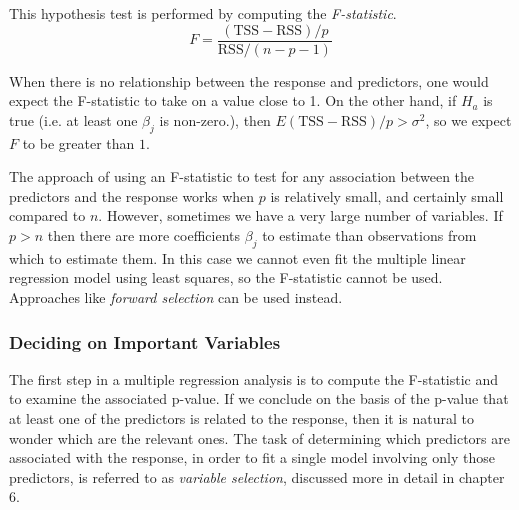 \documentclass{article}
\numberwithin{equation}{section}
\begin{document}
This hypothesis test is performed by computing the \textit{F-statistic}.
\begin{equation}
    F = \frac{(\text{TSS} - \text{RSS})/p }{\text{RSS}/ (n-p-1)}
\end{equation}

When there is no relationship between the response and predictors, one would expect the F-statistic to take on a value close to 1. On the other hand, if $H_a$ is true (i.e. at least one $\beta_j$ is non-zero.), then $E{(\text{TSS} - \text{RSS})/p} > \sigma^2$, so we expect $F$ to be greater than $1$.

The approach of using an F-statistic to test for any association between the predictors and the response works when $p$ is relatively small, and certainly small compared to $n$. However, sometimes we have a very large number of variables. If $p>n$ then there are more coefficients $\beta_j$ to estimate than observations from which to estimate them. In this case we cannot even fit the multiple linear regression model using least squares, so the F-statistic cannot be used. Approaches like \textit{forward selection} can be used instead.

\subsubsection{Deciding on Important Variables}
The first step in a multiple regression analysis is to compute the F-statistic and to examine the associated p-value. If we conclude on the basis of the p-value that at least one of the predictors is related to the response, then it is natural to wonder which are the relevant ones. The task of determining which predictors are associated with the response, in order to fit a single model involving only those predictors, is referred to as \textit{variable selection}, discussed more in detail in chapter 6.
\end{document}
